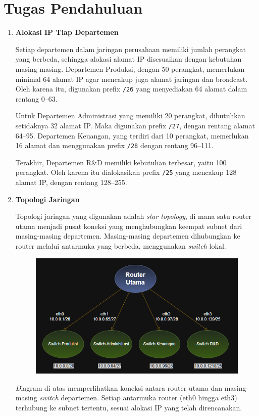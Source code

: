 \section*{Tugas Pendahuluan}
\begin{enumerate}
    \item \textbf{Alokasi IP Tiap Departemen}

    Setiap departemen dalam jaringan perusahaan memiliki jumlah perangkat yang berbeda, sehingga alokasi alamat IP disesuaikan dengan kebutuhan masing-masing. Departemen Produksi, dengan 50 perangkat, memerlukan minimal 64 alamat IP agar mencakup juga alamat jaringan dan broadcast. Oleh karena itu, digunakan prefix \texttt{/26} yang menyediakan 64 alamat dalam rentang 0--63.

    Untuk Departemen Administrasi yang memiliki 20 perangkat, dibutuhkan setidaknya 32 alamat IP. Maka digunakan prefix \texttt{/27}, dengan rentang alamat 64--95. Departemen Keuangan, yang terdiri dari 10 perangkat, memerlukan 16 alamat dan menggunakan prefix \texttt{/28} dengan rentang 96--111.

    Terakhir, Departemen R\&D memiliki kebutuhan terbesar, yaitu 100 perangkat. Oleh karena itu dialokasikan prefix \texttt{/25} yang mencakup 128 alamat IP, dengan rentang 128--255.

    \item \textbf{Topologi Jaringan}

    Topologi jaringan yang digunakan adalah \textit{star topology}, di mana satu router utama menjadi pusat koneksi yang menghubungkan keempat subnet dari masing-masing departemen. Masing-masing departemen dihubungkan ke router melalui antarmuka yang berbeda, menggunakan \textit{switch} lokal.

    \begin{figure}[H]
        \centering
        \includegraphics[width=0.5\linewidth]{Screenshot 2025-05-09 135115.png}
        \label{fig:enter-label}
    \end{figure}

    \textit Diagram di atas memperlihatkan koneksi antara router utama dan masing-masing \textit{switch} departemen. Setiap antarmuka router (eth0 hingga eth3) terhubung ke subnet tertentu, sesuai alokasi IP yang telah direncanakan.


\end{enumerate}
